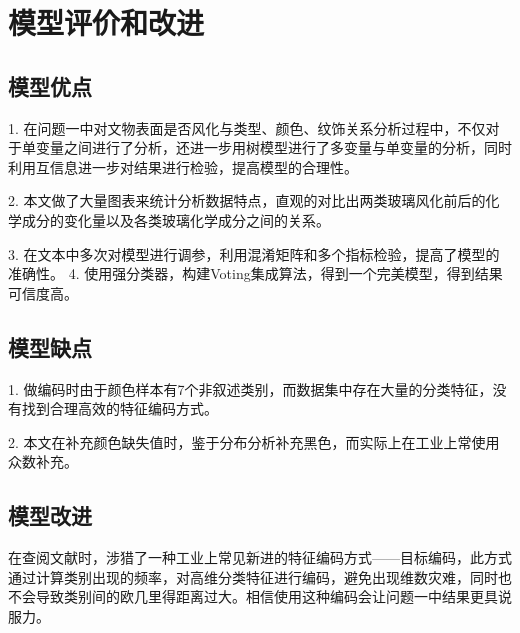 \section{模型评价和改进}

\subsection{模型优点}

1. 在问题一中对文物表面是否风化与类型、颜色、纹饰关系分析过程中，不仅对于单变量之间进行了分析，还进一步用树模型进行了多变量与单变量的分析，同时利用互信息进一步对结果进行检验，提高模型的合理性。

2. 本文做了大量图表来统计分析数据特点，直观的对比出两类玻璃风化前后的化学成分的变化量以及各类玻璃化学成分之间的关系。

3. 在文本中多次对模型进行调参，利用混淆矩阵和多个指标检验，提高了模型的准确性。
4. 使用强分类器，构建Voting集成算法，得到一个完美模型，得到结果可信度高。

\subsection{模型缺点}

1. 做编码时由于颜色样本有7个非叙述类别，而数据集中存在大量的分类特征，没有找到合理高效的特征编码方式。

2. 本文在补充颜色缺失值时，鉴于分布分析补充黑色，而实际上在工业上常使用众数补充。

\subsection{模型改进}

在查阅文献时，涉猎了一种工业上常见新进的特征编码方式——目标编码，此方式通过计算类别出现的频率，对高维分类特征进行编码，避免出现维数灾难，同时也不会导致类别间的欧几里得距离过大。相信使用这种编码会让问题一中结果更具说服力。